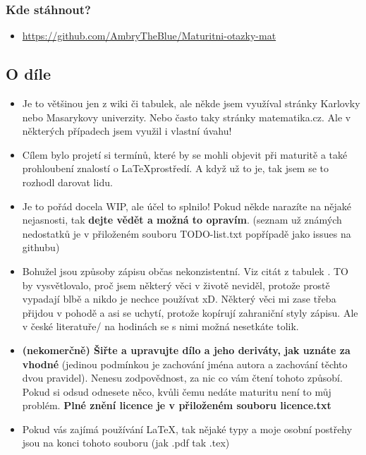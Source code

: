 \documentclass[12pt]{article}
\begin{document}
\subsubsection{Kde stáhnout?}
\begin{itemize}
\item \url{https://github.com/AmbryTheBlue/Maturitni-otazky-mat}

\end{itemize}
\subsection{O díle}
\begin{itemize}
\item Je to většinou jen z wiki či tabulek, ale někde jsem využíval stránky Karlovky nebo Masarykovy univerzity. Nebo často taky stránky matematika.cz. Ale v některých případech jsem využil i vlastní úvahu!
\item Cílem bylo projetí si termínů, které by se mohli objevit při maturitě a také prohloubení znalostí o \LaTeX prostředí. A když už to je, tak jsem se to rozhodl darovat lidu.
\item Je to pořád docela WIP, ale účel to splnilo! Pokud někde narazíte na nějaké nejasnosti, tak \textbf{dejte vědět a možná to opravím}. (seznam už známých nedostatků je v  přiloženém souboru TODO-list.txt popřípadě jako issues na githubu)
\item Bohužel jsou způsoby zápisu občas nekonzistentní. Viz citát z tabulek . TO by vysvětlovalo, proč jsem některý věci v životě neviděl, protože prostě vypadají blbě a nikdo je nechce používat xD. Některý věci mi zase třeba přijdou v pohodě a asi se uchytí, protože kopírují zahraniční styly zápisu. Ale v české literatuře/ na hodinách se s nimi možná nesetkáte tolik.
\item \textbf{(nekomerčně) Šiřte a upravujte dílo a jeho deriváty, jak uznáte za vhodné} (jedinou podmínkou je zachování jména autora a zachování těchto dvou pravidel). Nenesu zodpovědnost, za nic co vám čtení tohoto způsobí. Pokud si odsud odnesete něco, kvůli čemu nedáte maturitu není to můj problém.
\textbf{Plné znění licence je v přiloženém souboru licence.txt}
\item Pokud vás zajímá používání \LaTeX , tak nějaké typy a moje osobní postřehy jsou na konci tohoto souboru (jak .pdf tak .tex) %
\end{itemize}
\end{document}
